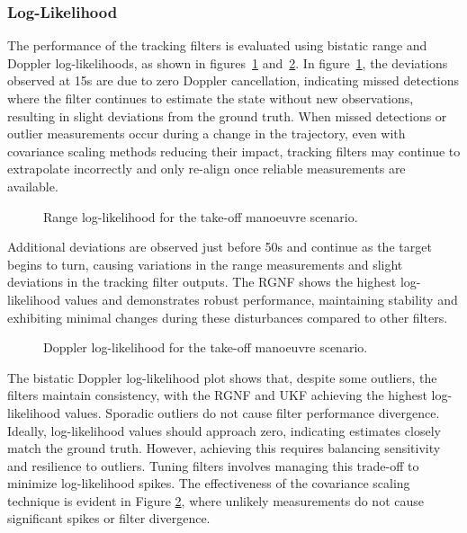 \subsubsection{Log-Likelihood}
The performance of the tracking filters is evaluated using bistatic range and Doppler log-likelihoods, as shown in figures~\ref{fig:rangeLogLikePtakeoff} and~\ref{fig:dopplerLogLikePTakeoff}. In figure~\ref{fig:rangeLogLikePtakeoff}, the deviations observed at 15s are due to zero Doppler cancellation, indicating missed detections where the filter continues to estimate the state without new observations, resulting in slight deviations from the ground truth.  When missed detections or outlier measurements occur during a change in the trajectory, even with covariance scaling methods reducing their impact, tracking filters may continue to extrapolate incorrectly and only re-align once reliable measurements are available.

\begin{figure}[H]
    \centering
    
    \caption{Range log-likelihood for the take-off manoeuvre scenario.}
    \label{fig:rangeLogLikePtakeoff}
\end{figure}

Additional deviations are observed just before 50s and continue as the target begins to turn, causing variations in the range measurements and slight deviations in the tracking filter outputs. The \ac{RGNF} shows the highest log-likelihood values and demonstrates robust performance, maintaining stability and exhibiting minimal changes during these disturbances compared to other filters.

\begin{figure}[H]
    \centering
    
    \caption{Doppler log-likelihood for the take-off manoeuvre scenario.}
    \label{fig:dopplerLogLikePTakeoff}
\end{figure}

The bistatic Doppler log-likelihood plot shows that, despite some outliers, the filters maintain consistency, with the \ac{RGNF} and \ac{UKF} achieving the highest log-likelihood values. Sporadic outliers do not cause filter performance divergence. Ideally, log-likelihood values should approach zero, indicating estimates closely match the ground truth. However, achieving this requires balancing sensitivity and resilience to outliers. Tuning filters involves managing this trade-off to minimize log-likelihood spikes. The effectiveness of the covariance scaling technique is evident in Figure \ref{fig:dopplerLogLikePTakeoff}, where unlikely measurements do not cause significant spikes or filter divergence.

